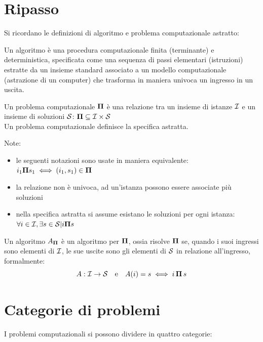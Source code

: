 \section{Ripasso}

Si ricordano le definizioni di algoritmo e problema computazionale astratto:

\begin{definition}[Algoritmo]\label{def:alg}
    Un algoritmo è una procedura computazionale finita (terminante) e deterministica, specificata come una sequenza di passi elementari (istruzioni) estratte da un insieme standard associato a un modello computazionale (astrazione di un computer) che trasforma in maniera univoca un ingresso in un uscita.
\end{definition}


\begin{definition}\label{def:probcomp}
    Un problema computazionale $\bm{\Pi}{}$ è una relazione tra un insieme di istanze $\mathcal{I}{}$ e un insieme di soluzioni $\mathcal{S}{}$: $\bm{\Pi}{} \subseteq \mathcal{I}{} \times \mathcal{S}{}$
    \\
    Un problema computazionale definisce la specifica astratta. %
\end{definition}

Note:
\begin{itemize}[noitemsep,parsep=0pt,partopsep=0pt,topsep=0pt]
    \item le seguenti notazioni sono usate in maniera equivalente: $i_1 \bm{\Pi}{} s_1 \iff (i_1 , s_1 ) \in \bm{\Pi}{}$
    \item la relazione non è univoca, ad un'istanza possono essere associate più soluzioni
    \item nella specifica astratta si assume esistano le soluzioni per ogni istanza:\\
        $\forall i \in \mathcal{I}{},\exists s \in \mathcal{S}{} | i \bm{\Pi}{} s$
\end{itemize}

Un algoritmo $A_{\bm{\Pi}{}}$ è un algoritmo per $\bm{\Pi}{}$, ossia risolve $\bm{\Pi}{}$ se, quando i suoi ingressi sono elementi di $\mathcal{I}{}$, le sue uscite sono gli elementi di $\mathcal{S}{}$ in relazione all'ingresso, formalmente:
$$ A: \mathcal{I}{} \to \mathcal{S}{} \quad \textrm{e} \quad A(i)=s \iff i \, \bm{\Pi}{} \, s $$

\section{Categorie di problemi}
I problemi computazionali si possono dividere in quattro categorie:

